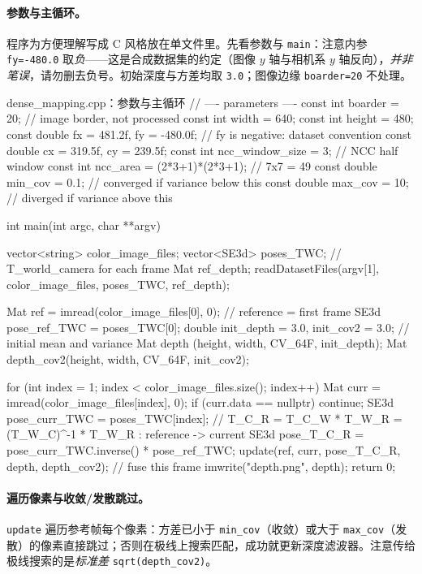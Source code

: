 \paragraph{参数与主循环。}
程序为方便理解写成 C 风格放在单文件里\cite{gaoxiang2019slam14}。先看参数与 \texttt{main}：注意内参 \texttt{fy=-480.0} 取\emph{负}——这是合成数据集的约定（图像 $y$ 轴与相机系 $y$ 轴反向），\emph{并非笔误}，请勿删去负号。初始深度与方差均取 \texttt{3.0}；图像边缘 \texttt{boarder=20} 不处理。

\begin{codebox}[C++]{dense\_mapping.cpp：参数与主循环}
// ---- parameters ----
const int    boarder = 20;        // image border, not processed
const int    width   = 640;
const int    height  = 480;
const double fx = 481.2f, fy = -480.0f;  // fy is negative: dataset convention
const double cx = 319.5f, cy = 239.5f;
const int    ncc_window_size = 3;             // NCC half window
const int    ncc_area = (2*3+1)*(2*3+1);      // 7x7 = 49
const double min_cov = 0.1;       // converged if variance below this
const double max_cov = 10;        // diverged  if variance above this

int main(int argc, char **argv) {
  vector<string> color_image_files;
  vector<SE3d>   poses_TWC;        // T_world_camera for each frame
  Mat ref_depth;
  readDatasetFiles(argv[1], color_image_files, poses_TWC, ref_depth);

  Mat ref = imread(color_image_files[0], 0);    // reference = first frame
  SE3d pose_ref_TWC = poses_TWC[0];
  double init_depth = 3.0, init_cov2 = 3.0;     // initial mean and variance
  Mat depth     (height, width, CV_64F, init_depth);
  Mat depth_cov2(height, width, CV_64F, init_cov2);

  for (int index = 1; index < color_image_files.size(); index++) {
    Mat curr = imread(color_image_files[index], 0);
    if (curr.data == nullptr) continue;
    SE3d pose_curr_TWC = poses_TWC[index];
    // T_C_R = T_C_W * T_W_R = (T_W_C)^-1 * T_W_R : reference -> current
    SE3d pose_T_C_R = pose_curr_TWC.inverse() * pose_ref_TWC;
    update(ref, curr, pose_T_C_R, depth, depth_cov2);  // fuse this frame
  }
  imwrite("depth.png", depth);
  return 0;
}
\end{codebox}

\paragraph{遍历像素与收敛/发散跳过。}
\texttt{update} 遍历参考帧每个像素：方差已小于 \texttt{min\_cov}（收敛）或大于 \texttt{max\_cov}（发散）的像素直接跳过；否则在极线上搜索匹配，成功就更新深度滤波器。注意传给极线搜索的是\emph{标准差} \texttt{sqrt(depth\_cov2)}。

